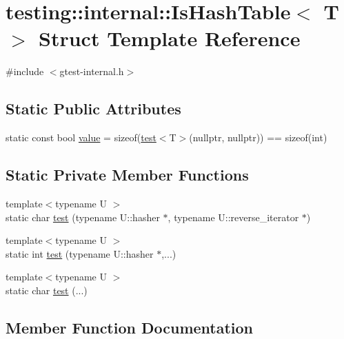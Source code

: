 \hypertarget{structtesting_1_1internal_1_1IsHashTable}{}\section{testing\+:\+:internal\+:\+:Is\+Hash\+Table$<$ T $>$ Struct Template Reference}
\label{structtesting_1_1internal_1_1IsHashTable}


{\ttfamily \#include $<$gtest-\/internal.\+h$>$}

\subsection*{Static Public Attributes}
\begin{DoxyCompactItemize}
\item 
static const bool \hyperlink{structtesting_1_1internal_1_1IsHashTable_a165e0a3eddfa5fadf9b950be6432d848}{value} = sizeof(\hyperlink{structtesting_1_1internal_1_1IsHashTable_acc4d1e2307a1e0527932da7a7d354f06}{test}$<$T$>$(nullptr, nullptr)) == sizeof(int)
\end{DoxyCompactItemize}
\subsection*{Static Private Member Functions}
\begin{DoxyCompactItemize}
\item 
{\footnotesize template$<$typename U $>$ }\\static char \hyperlink{structtesting_1_1internal_1_1IsHashTable_acc4d1e2307a1e0527932da7a7d354f06}{test} (typename U\+::hasher $\ast$, typename U\+::reverse\+\_\+iterator $\ast$)
\item 
{\footnotesize template$<$typename U $>$ }\\static int \hyperlink{structtesting_1_1internal_1_1IsHashTable_a195b49a6ae5090b6266a5fa4ab771962}{test} (typename U\+::hasher $\ast$,...)
\item 
{\footnotesize template$<$typename U $>$ }\\static char \hyperlink{structtesting_1_1internal_1_1IsHashTable_a40461295b959ff31e06241d4de072be0}{test} (...)
\end{DoxyCompactItemize}


\subsection{Member Function Documentation}
\mbox{\label{structtesting_1_1internal_1_1IsHashTable_acc4d1e2307a1e0527932da7a7d354f06}} 

